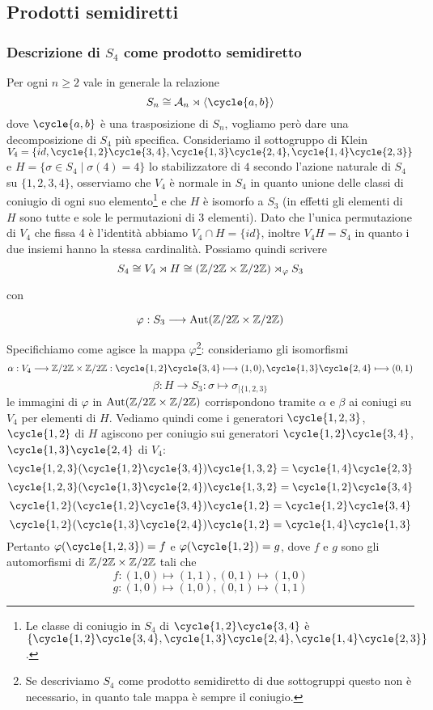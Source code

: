 \documentclass[11pt]{scrartcl}
\begin{document}
\newpage

\subsection{Prodotti semidiretti}

\subsubsection{Descrizione di $S_4$ come prodotto semidiretto}

Per ogni $n \geq 2$ vale in generale la relazione 
\[
    S_n \cong \mathcal{A}_n \rtimes \langle\cycle{a, b}\rangle
\]
dove $\cycle{a, b}$ è una trasposizione di $S_n$, vogliamo però dare una
decomposizione di $S_4$ più specifica. \newline
Consideriamo il sottogruppo di Klein $V_4 = \{id, \cycle{1, 2}\cycle{3, 4}, \cycle{1, 3}\cycle{2, 4},
\cycle{1, 4}\cycle{2, 3}\}$ e $H = \{\sigma \in S_4\mid \sigma(4) = 4\}$ lo 
stabilizzatore di $4$ secondo l'azione naturale di $S_4$ su $\{1, 2, 3, 4\}$,
osserviamo che $V_4$ è normale in $S_4$ in quanto
unione delle classi di coniugio di ogni suo elemento\footnote{
    Le classe di coniugio in $S_4$ di $\cycle{1, 2}\cycle{3, 4}$ è 
    $\{\cycle{1, 2}\cycle{3, 4}, \cycle{1, 3}\cycle{2, 4}, \cycle{1, 4}\cycle{2, 3}\}$.
}
e che $H$ è isomorfo a $S_3$ (in effetti gli elementi di $H$ sono tutte e 
sole le permutazioni di 3 elementi). Dato che l'unica permutazione di $V_4$
che fissa 4 è l'identità abbiamo $V_4 \cap H = \{id\}$, inoltre $V_4H = S_4$
in quanto i due insiemi hanno la stessa cardinalità. Possiamo quindi scrivere
\[
    S_4 \cong V_4 \rtimes H \cong (\mathbb{Z}/{2}\mathbb{Z} \times \mathbb{Z}/{2}\mathbb{Z}) \rtimes_{\varphi} S_3
\]

con

\[
    \varphi: S_3 \longrightarrow \operatorname{Aut}(\mathbb{Z}/{2}\mathbb{Z}\times\mathbb{Z}/{2}\mathbb{Z})
\]

Specifichiamo come agisce la mappa $\varphi$\footnote{Se descriviamo $S_4$ 
    come prodotto semidiretto di due sottogruppi questo non è 
    necessario, in quanto tale mappa è sempre il coniugio.
}:
consideriamo gli isomorfismi
\[
    \alpha: V_4\longrightarrow \Z2\times\Z2: \cycle{1, 2}\cycle{3, 4}\longmapsto (1, 0),
    \cycle{1, 3}\cycle{2, 4} \longmapsto (0, 1)
\]
\[
    \beta: H \longrightarrow S_3: \sigma \longmapsto \sigma_{\mid\{1, 2, 3\}}
\]
le immagini di $\varphi$ in $\operatorname{Aut}(\mathbb{Z}/{2}\mathbb{Z}\times\mathbb{Z}/{2}\mathbb{Z})$ corrispondono tramite $\alpha$
e $\beta$ ai coniugi su $V_4$ per elementi di $H$. Vediamo quindi come
i generatori $\cycle{1, 2, 3}$, $\cycle{1, 2}$ di $H$ agiscono per coniugio
sui generatori $\cycle{1, 2}\cycle{3, 4}$, $\cycle{1, 3}\cycle{2, 4}$ di $V_4$:
\[
    \cycle{1, 2, 3}(\cycle{1, 2}\cycle{3, 4})\cycle{1, 3, 2} = \cycle{1, 4}\cycle{2, 3}
\]
\[
    \cycle{1, 2, 3}(\cycle{1, 3}\cycle{2, 4})\cycle{1, 3, 2} = \cycle{1, 2}\cycle{3, 4}
\]
\[
    \cycle{1, 2}(\cycle{1, 2}\cycle{3, 4})\cycle{1, 2} = \cycle{1, 2}\cycle{3, 4}
\]
\[
    \cycle{1, 2}(\cycle{1, 3}\cycle{2, 4})\cycle{1, 2} = \cycle{1, 4}\cycle{1, 3}
\]
Pertanto $\varphi(\cycle{1, 2, 3}) = f$ e $\varphi(\cycle{1, 2}) = g$,
dove $f$ e $g$ sono gli automorfismi di $\mathbb{Z}/{2}\mathbb{Z}\times\mathbb{Z}/{2}\mathbb{Z}$ tali che
\[
    f: (1, 0)\longmapsto (1, 1), (0, 1) \longmapsto (1, 0)
\]
\[
    g: (1, 0)\longmapsto (1, 0), (0, 1) \longmapsto (1, 1)
\]
\end{document}
